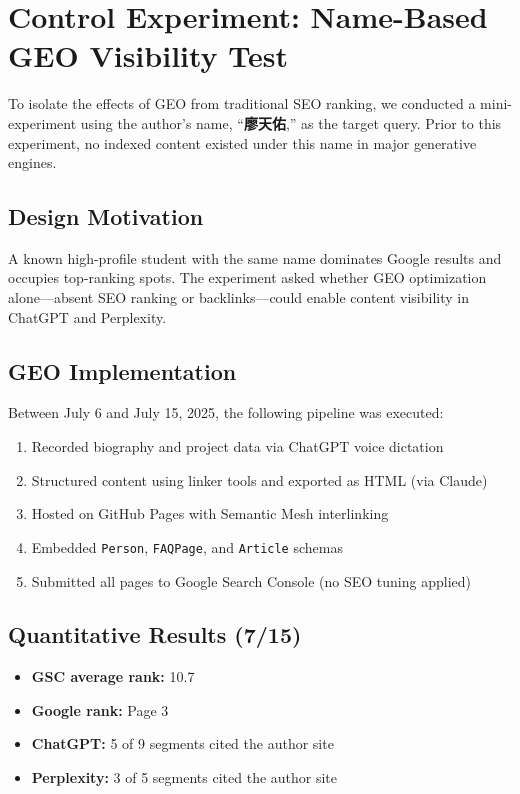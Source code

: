 \section{Control Experiment: Name-Based GEO Visibility Test}

To isolate the effects of GEO from traditional SEO ranking, we conducted a mini-experiment using the author’s name, ``\textbf{廖天佑},'' as the target query. Prior to this experiment, no indexed content existed under this name in major generative engines.

\subsection{Design Motivation}
A known high-profile student with the same name dominates Google results and occupies top-ranking spots. The experiment asked whether GEO optimization alone---absent SEO ranking or backlinks---could enable content visibility in ChatGPT and Perplexity.

\subsection{GEO Implementation}
Between July 6 and July 15, 2025, the following pipeline was executed:
\begin{enumerate}
  \item Recorded biography and project data via ChatGPT voice dictation
  \item Structured content using linker tools and exported as HTML (via Claude)
  \item Hosted on GitHub Pages with Semantic Mesh interlinking
  \item Embedded \texttt{Person}, \texttt{FAQPage}, and \texttt{Article} schemas
  \item Submitted all pages to Google Search Console (no SEO tuning applied)
\end{enumerate}

\subsection{Quantitative Results (7/15)}
\begin{itemize}
  \item \textbf{GSC average rank:} 10.7
  \item \textbf{Google rank:} Page 3
  \item \textbf{ChatGPT:} 5 of 9 segments cited the author site
  \item \textbf{Perplexity:} 3 of 5 segments cited the author site
\end{itemize}

